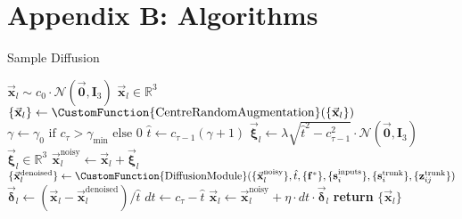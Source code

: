 \section*{Appendix B: Algorithms}
\begin{algorithm}
     \caption{Sample Diffusion}
     {\small
     \begin{algorithmic}[1]
         \State $\vec{\mathbf{x}}_l \sim c_0 \cdot \mathcal{N}(\vec{\mathbf{0}}, \mathbf{I}_3)$ \hfill $\vec{\mathbf{x}}_l \in \mathbb{R}^3$
             \State $\{\vec{\mathbf{x}}_l\} \gets \CustomFunction{\text{CentreRandomAugmentation}}(\{\vec{\mathbf{x}}_l\})$
             \State $\gamma \gets \gamma_0 \text{ if } c_\tau > \gamma_{\min} \text{ else } 0$
             \State $\hat{t} \gets c_{\tau-1}(\gamma + 1)$
             \State $\vec{\boldsymbol{\xi}}_l \gets \lambda \sqrt{\hat{t}^2 - c_{\tau-1}^2} \cdot \mathcal{N}(\vec{\mathbf{0}}, \mathbf{I}_3)$ \hfill $\vec{\boldsymbol{\xi}}_l \in \mathbb{R}^3$
             \State $\vec{\mathbf{x}}_l^{\text{noisy}} \gets \vec{\mathbf{x}}_l + \vec{\boldsymbol{\xi}}_l$
             \State $\{\vec{\mathbf{x}}_l^{\text{denoised}}\} \gets \CustomFunction{\text{DiffusionModule}}(\{\vec{\mathbf{x}}_l^{\text{noisy}}\}, \hat{t}, \{\mathbf{f}^*\}, \{\mathbf{s}_i^{\text{inputs}}\}, \{\mathbf{s}_i^{\text{trunk}}\}, \{\mathbf{z}_{ij}^{\text{trunk}}\})$
             \State $\vec{\boldsymbol{\delta}}_l \gets (\vec{\mathbf{x}}_l - \vec{\mathbf{x}}_l^{\text{denoised}})/\hat{t}$
             \State $dt \gets c_\tau - \hat{t}$
             \State $\vec{\mathbf{x}}_l \gets \vec{\mathbf{x}}_l^{\text{noisy}} + \eta \cdot dt \cdot \vec{\boldsymbol{\delta}}_l$
         \EndFor
         \State \textbf{return} $\{\vec{\mathbf{x}}_l\}$
         \end{algorithmic}
     }
\end{algorithm}

